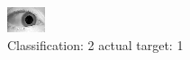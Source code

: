 \begin{figure}[h!]
\begin{center}
\includegraphics[width=0.60\columnwidth]{figures/ID1514_class_2_target_1.png}
\end{center}
\caption{ Classification: 2 actual target: 1}
\label{fig:ID1514_class_2_target_1}
\end{figure}
